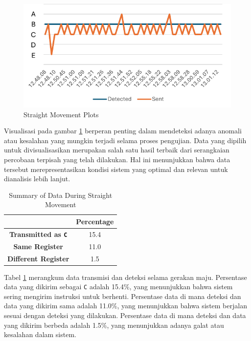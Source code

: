 \begin{figure}[H]
    \centering
    \includegraphics[width=1\textwidth]{gambar/tex/forward.pdf}
    \caption{Straight Movement Plots}
    \label{fig:straight_movement_plots}
\end{figure}

Visualisasi pada gambar \ref{fig:straight_movement_plots} berperan penting dalam mendeteksi adanya anomali atau kesalahan yang mungkin terjadi selama proses pengujian. Data yang dipilih untuk divisualisasikan merupakan salah satu hasil terbaik dari serangkaian percobaan terpisah yang telah dilakukan. Hal ini menunjukkan bahwa data tersebut merepresentasikan kondisi sistem yang optimal dan relevan untuk dianalisis lebih lanjut.

\begin{table}[H]
    \centering
    \caption{Summary of Data During Straight Movement}
    \label{tab:straight_movement_data_transmission_detection}
    \begin{tabular}{|c|c|}
        \hline 
        \cellcolor[HTML]{000000} & \cellcolor[HTML]{C0C0C0} \textbf{Percentage}   \\ \hline
        \cellcolor[HTML]{C0C0C0} \textbf{Transmitted as \texttt{C}} & 15.4  \\ \hline
        \cellcolor[HTML]{C0C0C0} \textbf{Same Register}  & 11.0  \\ \hline
        \cellcolor[HTML]{C0C0C0} \textbf{Different Register}   & 1.5  \\ \hline
    \end{tabular}
\end{table}

Tabel \ref{tab:straight_movement_data_transmission_detection} merangkum data transmisi dan deteksi selama gerakan maju. Persentase data yang dikirim sebagai \texttt{C} adalah 15.4\%, yang menunjukkan bahwa sistem sering mengirim instruksi untuk berhenti. Persentase data di mana deteksi dan data yang dikirim sama adalah 11.0\%, yang menunjukkan bahwa sistem berjalan sesuai dengan deteksi yang dilakukan. Persentase data di mana deteksi dan data yang dikirim berbeda adalah 1.5\%, yang menunjukkan adanya galat atau kesalahan dalam sistem.

